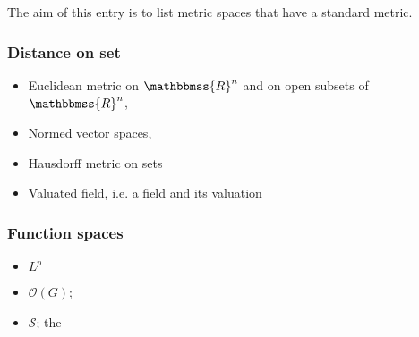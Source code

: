 \documentclass[12pt]{article}
\newcommand{\R}{\mathbbmss{R}}
\begin{document}
The aim of this entry is to list metric spaces that have a 
standard metric. 

\subsubsection*{Distance on set}
\begin{itemize}
\item Euclidean metric on $\R^n$ and on open subsets of $\R^n$,
\item Normed vector spaces,
\item Hausdorff metric on sets
\item Valuated field, i.e. a field and its valuation
\end{itemize}

\subsubsection*{Function spaces}
\begin{itemize}
\item $L^p$ 
\item $\mathcal{O}(G)$; 
\item $\mathscr{S}$; the
\end{itemize}
\end{document}
